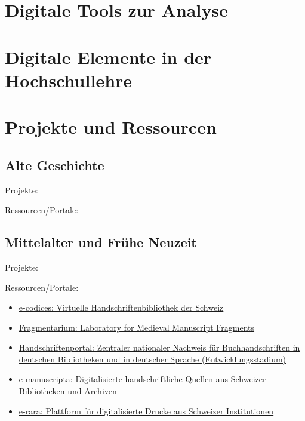 \documentclass[
  letterpaper,
]{book}
\begin{document}
\hypertarget{digitale-tools-zur-analyse}{%
\section{Digitale Tools zur Analyse}\label{digitale-tools-zur-analyse}}

\hypertarget{digitale-elemente-in-der-hochschullehre}{%
\section{Digitale Elemente in der
Hochschullehre}\label{digitale-elemente-in-der-hochschullehre}}

\hypertarget{sec-projects}{%
\section{Projekte und Ressourcen}\label{sec-projects}}

\hypertarget{alte-geschichte}{%
\subsection{Alte Geschichte}\label{alte-geschichte}}

Projekte:

Ressourcen/Portale:

\hypertarget{sec-projects-ma-fnz}{%
\subsection{Mittelalter und Frühe Neuzeit}\label{sec-projects-ma-fnz}}

Projekte:

Ressourcen/Portale:

\begin{itemize}
\item
  \href{https://www.e-codices.unifr.ch/de}{e-codices: Virtuelle
  Handschriftenbibliothek der Schweiz}
\item
  \href{https://fragmentarium.ms/}{Fragmentarium: Laboratory for
  Medieval Manuscript Fragments}
\item
  \href{https://handschriftenportal.de/}{Handschriftenportal: Zentraler
  nationaler Nachweis für Buchhandschriften in deutschen Bibliotheken
  und in deutscher Sprache (Entwicklungsstadium)}
\item
  \href{https://www.e-manuscripta.ch/?lang=de}{e-manuscripta:
  Digitalisierte handschriftliche Quellen aus Schweizer Bibliotheken und
  Archiven}
\item
  \href{https://www.e-rara.ch/?lang=de}{e-rara: Plattform für
  digitalisierte Drucke aus Schweizer Institutionen}
\end{itemize}
\end{document}
